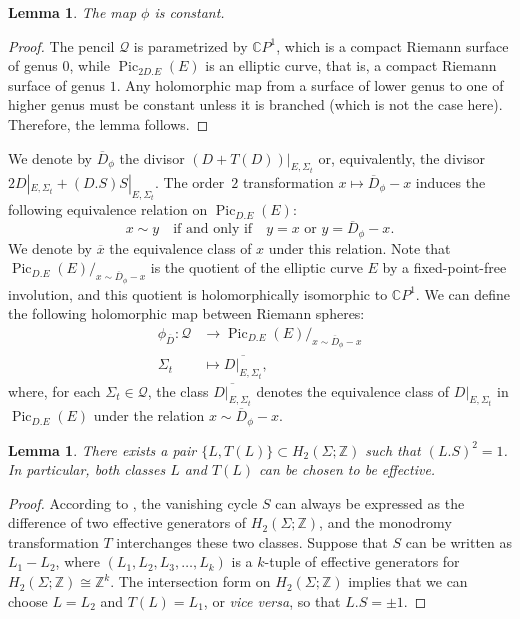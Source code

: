 \documentclass[10pt,a4paper]{article}
\numberwithin{equation}{section}
\theoremstyle{definition}
\theoremstyle{plain}
\newtheorem{lemma}[definition]{Lemma}
\theoremstyle{remark}
\newcommand{\Z}{\mathbb{Z}}
\newcommand{\C}{\mathbb{C}}
\DeclareMathOperator{\Pic}{Pic}
\begin{document}
\begin{lemma} \label{lem-constant.map}
The map $\phi$ is constant.
\end{lemma} 

\begin{proof}
  The pencil $\mathcal{Q}$ is parametrized by $\mathbb{C}P^1$, which is a compact Riemann surface of genus $0$, while $\Pic_{2D.E}(E)$ is an elliptic curve, that is, a compact Riemann surface of genus $1$. 
Any holomorphic map from a surface of lower genus to one of higher genus must be constant unless it is branched (which is not the case here). Therefore, the lemma follows. 
\end{proof}
  
We denote by $\overline{D}_{\phi}$ the divisor $(D+T(D))|_{E,\Sigma_t}$ or, equivalently, the divisor  $2D|_{E,\Sigma_t}+(D.S) S|_{E,\Sigma_t}$. The order~$2$ transformation $x \mapsto \overline{D}_{\phi} - x$ induces the following equivalence  relation on $\Pic_{D.E} (E)$:
$$x \sim y \quad \text{if and only if}\quad y=x \text{ or } y=\overline{D}_{\phi}-x.$$
We denote by $\overline{x}$ the equivalence class of $x$ under this relation.
Note that $\Pic_{D.E} (E)/_{x \sim \overline{D}_{\phi}-x}$ is the quotient of the elliptic curve $E$ by a fixed-point-free involution, and this quotient is holomorphically  
isomorphic to $\C {P}^1$.
We can define the following 
holomorphic map between Riemann spheres:
    \begin{align*}
    \phi_{\overline{D}}\colon  \mathcal{Q} &\longrightarrow \Pic_{D.E} (E)/_{x \sim \overline{D}_{\phi}-x}\\
    \Sigma_t &\longmapsto \overline{D|_{E,\Sigma_t}}, 
\end{align*}
where, for each $\Sigma_t \in \mathcal{Q}$, the class $\overline{D|_{E, \Sigma_t}}$ denotes the equivalence class of $D|_{E, \Sigma_t}$ in $\Pic_{D.E}(E)$ under the relation $x \sim \overline{D}_{\phi} - x$.

\begin{lemma} \label{lem-existence.of.L}
There exists a pair $\{L,T(L)\}\subset H_2(\Sigma;\Z)$ such that $(L.S)^2=1$. In particular, both classes $L$ and  $T(L)$ can be chosen to be effective. 
\end{lemma} 

\begin{proof}
According to \cite[Claim (6), p.~26]{demazure2006seminaire}, the vanishing cycle $S$ can always be expressed as the difference of two effective generators of $H_2(\Sigma; \mathbb{Z})$, and the monodromy transformation $T$ interchanges these two classes. Suppose that $S$ can be written as $L_1-L_2$, where $(L_1,L_2,L_3,\ldots, L_k)$ is a $k$-tuple of effective generators for $H_2(\Sigma;\Z)\cong \Z^k$. The intersection form on $H_2(\Sigma;\Z)$ implies that we can choose $L=L_2$ and $T(L)=L_1$, or \textit{vice versa}, so that $L.S = \pm 1$.  
\end{proof}
\end{document}
